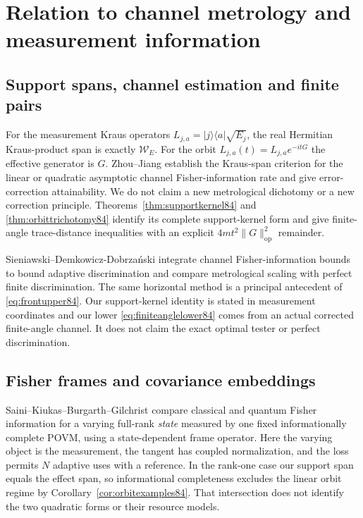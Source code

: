 \section{Relation to channel metrology and measurement information}
\label{sec:comparison84}

\subsection{Support spans, channel estimation and finite pairs}
For the measurement Kraus operators
$L_{j,a}=|j\rangle\langle a|\sqrt{E_j}$, the real Hermitian
Kraus-product span is exactly $\mathcal W_E$.  For the orbit
$L_{j,a}(t)=L_{j,a}e^{-itG}$ the effective generator is $G$.
Zhou--Jiang \cite[Theorems~1--3 and Section~V]{ZJ84} establish the
Kraus-span criterion for the linear or quadratic asymptotic channel
Fisher-information rate and give error-correction attainability.
We do not claim a new metrological dichotomy or a new correction
principle.  Theorems~\ref{thm:supportkernel84} and
\ref{thm:orbittrichotomy84} identify its complete support-kernel
form and give finite-angle trace-distance inequalities with an
explicit $4mt^2\|G\|_{\mathrm{op}}^2$ remainder.

Sieniawski--Demkowicz-Dobrza\'nski
\cite[Section~IV, equations~(16)--(23)]{SD76} integrate channel
Fisher-information bounds to bound adaptive discrimination and
compare metrological scaling with perfect finite discrimination.
The same horizontal method is a principal antecedent of
\eqref{eq:frontupper84}.  Our support-kernel identity is stated in
measurement coordinates and our lower \eqref{eq:finiteanglelower84}
comes from an actual corrected finite-angle channel.  It does not
claim the exact optimal tester or perfect discrimination.

\subsection{Fisher frames and covariance embeddings}
Saini--Kiukas--Burgarth--Gilchrist \cite[Theorem~1]{SKBG84} compare
classical and quantum Fisher information for a varying full-rank
\emph{state} measured by one fixed informationally complete POVM,
using a state-dependent frame operator.  Here the varying object
is the measurement, the tangent has coupled normalization, and the
loss permits $N$ adaptive uses with a reference.  In the rank-one
case our support span equals the effect span, so informational
completeness excludes the linear orbit regime by
Corollary~\ref{cor:orbitexamples84}.  That intersection does not
identify the two quadratic forms or their resource models.

